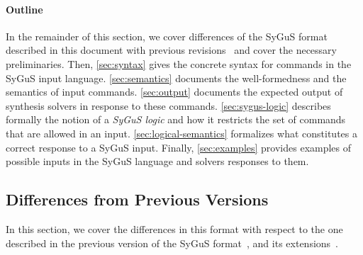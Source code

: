\documentclass[english,a4paper,10pt]{article}
\begin{document}
\begin{comment}
We would like to thank the following people for their helpful
suggestions and feedback regarding this document (listed alphabetically):
Haniel Barbosa,
Andres N\"otzli,
Sanjit A.~Seshia,
Rishabh Singh,
Cesare Tinelli.
\end{comment}

\paragraph{Outline}
In the remainder of this section, we cover differences of
the SyGuS format described in this document with previous revisions~\cite{sygusFormat,sygusSyntax2015,sygusSyntax2016}
and cover the necessary preliminaries.
Then,
\cref{sec:syntax}
gives the concrete syntax for commands in the SyGuS input language.
\cref{sec:semantics}
documents the well-formedness and the semantics of input commands.
\cref{sec:output}
documents the expected output of synthesis solvers in response to these commands.
\cref{sec:sygus-logic}
describes formally the notion of a \emph{SyGuS logic} and how it restricts
the set of commands that are allowed in an input.
\cref{sec:logical-semantics}
formalizes what constitutes a correct response to a SyGuS input.
Finally, \cref{sec:examples}
provides examples of possible inputs in the SyGuS language
and solvers responses to them.

\subsection{Differences from Previous Versions}

In this section, we cover the differences
in this format with respect to the one described in the previous
version of the SyGuS format~\cite{sygusFormat},
and its extensions~\cite{sygusSyntax2015,sygusSyntax2016}.
\end{document}
